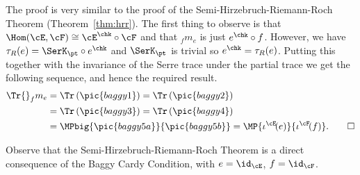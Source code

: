 \begin{Proof}
  The proof is very similar to the proof of the
  Semi-Hirzebruch-Rie\-mann-Roch Theorem (Theorem~\ref{thm:hrr}).  The first thing
  to observe is that $\Hom(\cE,\cF)\cong \cE^\chk\circ \cF$ and that
  ${}_f m_e$ is just $e^\chk\circ f$. However, we have
  $\tau_R(e)=\SerK_\pt\circ e^\chk$ and $\SerK_\pt$ is trivial so
  $e^\chk=\tau_R(e)$.  Putting this together with the invariance of
  the Serre trace under the partial trace we get the following
  sequence, and hence the required result.
  \begin{align*}
    \Tr {}_f m_e&=\Tr\left(\pic{baggy1}\right)
    =\Tr\left( \pic{baggy2}\right)\\
    &=\Tr\left( \pic{baggy3}\right)
    =\Tr\left( \pic{baggy4}\right)\\
    &=\MPbig{\pic{baggy5a}}{\pic{baggy5b}}
    =\MP{\iota^\cE\!(e)}{\iota^\cF\!(f)}.\qedhere
  \end{align*}
\end{Proof}
\medskip

\noindent
Observe that the Semi-Hirzebruch-Riemann-Roch Theorem is a direct
consequence of the Baggy Cardy Condition, with $e=\id_\cE$,
$f=\id_\cF$.
